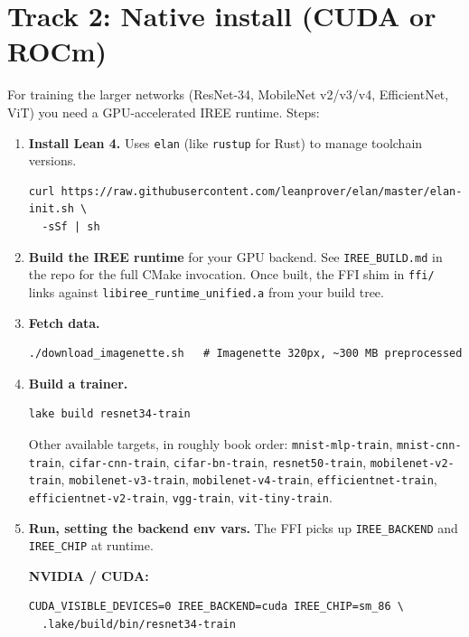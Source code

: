 \section*{Track 2: Native install (CUDA or ROCm)}

For training the larger networks (ResNet-34, MobileNet v2/v3/v4,
EfficientNet, ViT) you need a GPU-accelerated IREE runtime. Steps:

\begin{enumerate}
  \item \textbf{Install Lean 4.} Uses \texttt{elan} (like
    \texttt{rustup} for Rust) to manage toolchain versions.
\begin{verbatim}
curl https://raw.githubusercontent.com/leanprover/elan/master/elan-init.sh \
  -sSf | sh
\end{verbatim}

  \item \textbf{Build the IREE runtime} for your GPU backend. See
    \texttt{IREE\_BUILD.md} in the repo for the full CMake
    invocation. Once built, the FFI shim in \texttt{ffi/} links
    against \texttt{libiree\_runtime\_unified.a} from your build
    tree.

  \item \textbf{Fetch data.}
\begin{verbatim}
./download_imagenette.sh   # Imagenette 320px, ~300 MB preprocessed
\end{verbatim}

  \item \textbf{Build a trainer.}
\begin{verbatim}
lake build resnet34-train
\end{verbatim}

    Other available targets, in roughly book order:
    \texttt{mnist-mlp-train}, \texttt{mnist-cnn-train},
    \texttt{cifar-cnn-train}, \texttt{cifar-bn-train},
    \texttt{resnet50-train}, \texttt{mobilenet-v2-train},
    \texttt{mobilenet-v3-train}, \texttt{mobilenet-v4-train},
    \texttt{efficientnet-train}, \texttt{efficientnet-v2-train},
    \texttt{vgg-train}, \texttt{vit-tiny-train}.

  \item \textbf{Run, setting the backend env vars.} The FFI picks
    up \texttt{IREE\_BACKEND} and \texttt{IREE\_CHIP} at runtime.

    \textbf{NVIDIA / CUDA:}
\begin{verbatim}
CUDA_VISIBLE_DEVICES=0 IREE_BACKEND=cuda IREE_CHIP=sm_86 \
  .lake/build/bin/resnet34-train
\end{verbatim}


\end{enumerate}
